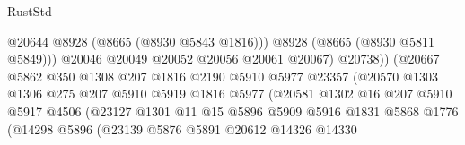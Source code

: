 \begin{lexlean}{RustStd}
\begin{coremodule}
                                            @20644
                                            @8928
                                            (@8665 (@8930 @5843 @1816)))
                                          @8928
                                          (@8665 (@8930 @5811 @5849)))
                                        @20046
                                        @20049
                                        @20052
                                        @20056
                                        @20061
                                        @20067)
                                      @20738))
                                  (@20667
                                    @5862
                                    @350
                                    @1308
                                    @207
                                    @1816
                                    @2190
                                    @5910
                                    @5977
                                    @23357
                                    (@20570
                                      @1303
                                      @1306
                                      @275
                                      @207
                                      @5910
                                      @5919
                                      @1816
                                      @5977
                                      (@20581
                                        @1302
                                        @16
                                        @207
                                        @5910
                                        @5917
                                        @4506
                                        (@23127
                                          @1301
                                          @11
                                          @15
                                          @5896
                                          @5909
                                          @5916
                                          @1831
                                          @5868
                                          @1776
                                          (@14298
                                            @5896
                                            (@23139
                                              @5876
                                              @5891
                                              @20612
                                              @14326
                                              @14330

\end{coremodule}
\end{lexlean}
